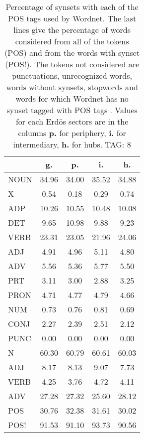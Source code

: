 \begin{table}[h!]
\begin{center}
\begin{tabular}{| l || c | c | c | c |}\hline
 & {\bf g.} & {\bf p.} & {\bf i.} & {\bf h.} \\\hline\hline
NOUN & 34.96  & 34.00  & 35.52  & 34.88 \\
X & 0.54  & 0.18  & 0.29  & 0.74 \\\hline
ADP & 10.26  & 10.55  & 10.48  & 10.08 \\
DET & 9.65  & 10.98  & 9.88  & 9.23 \\\hline
VERB & 23.31  & 23.05  & 21.96  & 24.06 \\\hline
ADJ & 4.91  & 4.96  & 5.11  & 4.80 \\
ADV & 5.56  & 5.36  & 5.77  & 5.50 \\\hline
PRT & 3.11  & 3.00  & 2.88  & 3.25 \\
PRON & 4.71  & 4.77  & 4.79  & 4.66 \\
NUM & 0.73  & 0.76  & 0.81  & 0.69 \\
CONJ & 2.27  & 2.39  & 2.51  & 2.12 \\
PUNC & 0.00  & 0.00  & 0.00  & 0.00 \\\hline\hline\hline
N & 60.30  & 60.79  & 60.61  & 60.03 \\\hline
ADJ & 8.17  & 8.13  & 9.07  & 7.73 \\\hline
VERB & 4.25  & 3.76  & 4.72  & 4.11 \\\hline
ADV & 27.28  & 27.32  & 25.60  & 28.12 \\\hline\hline
POS & 30.76  & 32.38  & 31.61  & 30.02 \\\hline
POS! & 91.53  & 91.10  & 93.73  & 90.56 \\\hline
\end{tabular}
\caption{Percentage of synsets with each of the POS tags used by Wordnet. The last lines give the percentage of words considered from all of the tokens (POS) and from the words with synset (POS!). The tokens not considered are punctuations, unrecognized words, words without synsets, stopwords and words for which Wordnet has no synset  tagged with POS tags . Values for each Erd\"os sectors are in the columns {{\bf p.}} for periphery, {{\bf i.}} for intermediary, {{\bf h.}} for hubs. TAG: 8}
\end{center}
\end{table}